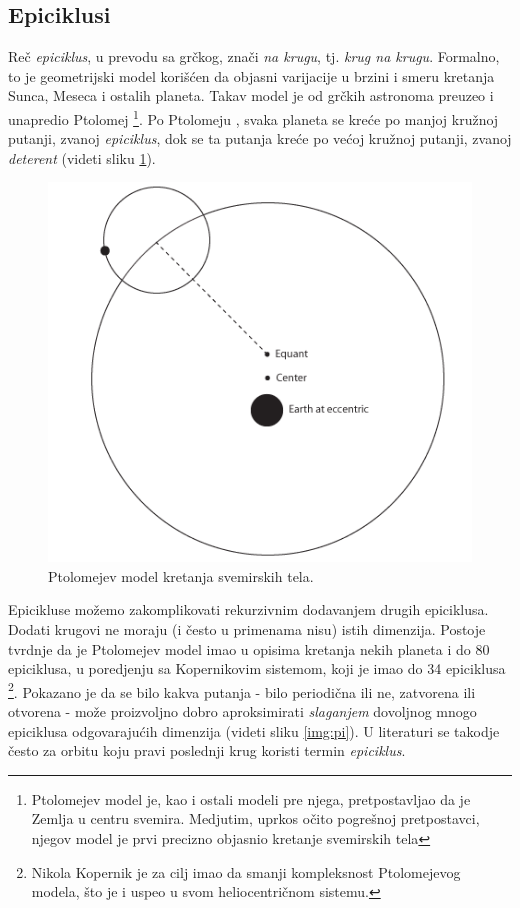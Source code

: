 \subsection{Epiciklusi}
\label{sec:Epicycles}

Re\v{c} \emph{epiciklus}, u prevodu sa gr\v{c}kog, zna\v{c}i \emph{na krugu}, tj. \emph{krug na krugu}. Formalno, to je geometrijski model kori\v{s}\'c{}en da objasni varijacije u brzini i smeru kretanja Sunca, Meseca i ostalih planeta. Takav model je od gr\v{c}kih astronoma preuzeo i unapredio Ptolomej \footnote{Ptolomejev model je, kao i ostali modeli pre njega, pretpostavljao da je Zemlja u centru svemira. Medjutim, uprkos o\v{c}ito pogre\v{s}noj pretpostavci, njegov model je prvi precizno objasnio kretanje svemirskih tela}. Po Ptolomeju \cite{PtolemaicModel}, svaka planeta se kre\'c{}e po manjoj kru\v{z}noj putanji, zvanoj \emph{epiciklus}, dok se ta putanja kre\'c{}e po ve\'c{}oj kru\v{z}noj putanji, zvanoj \emph{deterent} (videti sliku \ref{img:PtolemaicModel}). 

\begin{figure}
    \centering
    \includegraphics[scale=0.5]{images/ptolomaic_model.PNG}
    \caption{Ptolomejev model kretanja svemirskih tela.}
    \label{img:PtolemaicModel}
\end{figure}

Epicikluse mo\v{z}emo zakomplikovati rekurzivnim dodavanjem drugih epiciklusa. Dodati krugovi ne moraju (i \v{c}esto u primenama nisu) istih dimenzija. Postoje tvrdnje da je Ptolomejev model imao u opisima kretanja nekih planeta i do 80 epiciklusa, u poredjenju sa Kopernikovim sistemom, koji je imao do 34 epiciklusa \footnote{Nikola Kopernik je za cilj imao da smanji kompleksnost Ptolomejevog modela, \v{s}to je i uspeo u svom heliocentri\v{c}nom sistemu.}. Pokazano je da se bilo kakva putanja - bilo periodi\v{c}na ili ne, zatvorena ili otvorena - mo\v{z}e proizvoljno dobro aproksimirati \emph{slaganjem} dovoljnog mnogo epiciklusa odgovaraju\'c{}ih dimenzija (videti sliku \ref{img:pi}). U literaturi se takodje \v{c}esto za orbitu koju pravi poslednji krug koristi termin \emph{epiciklus}.

